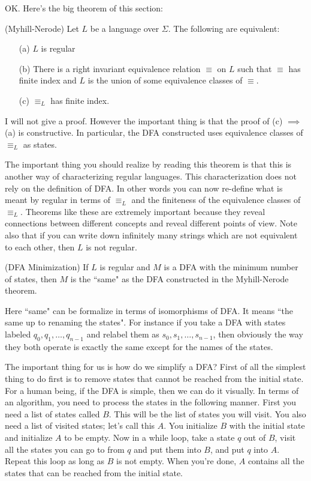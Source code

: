 OK. Here's the big theorem of this section:

\begin{thm} (Myhill-Nerode) \label{T:myhillnerode} Let $L$ be a language over
$\Sigma$.
The following are equivalent:
 \begin{itemize}
  \item[(a)] $L$ is regular
  \item[(b)] There is a right invariant equivalence relation $\equiv$  on $L$
   such that $\equiv$ has finite index and $L$ is the union of some
   equivalence classes of $\equiv$.
  \item[(c)] $\equiv_L$ has finite index.
 \end{itemize}
\end{thm}

I will not give a proof. However the important thing is that the
proof of (c) $\implies$ (a) is constructive. In particular, the DFA
constructed uses equivalence classes of $\equiv_L$ as states.

The important thing you should realize by reading this theorem is
that this is another way of characterizing regular languages. This
characterization does not rely on the definition of DFA. In other
words you can now re-define what is meant by regular in terms of
$\equiv_L$ and the finiteness of the equivalence classes of
$\equiv_L$. Theorems like these are extremely important because they
reveal connections between different concepts and reveal different
points of view. Note also that if you can write down infinitely many
strings which are not equivalent to each other, then $L$ is not
regular.

\begin{thm} (DFA Minimization) \label{T:dfaminimization}
 If $L$ is regular and $M$ is a DFA with the minimum number of
 states, then $M$ is the ``same" as the DFA constructed in the
 Myhill-Nerode theorem.
\end{thm}

Here ``same" can be formalize in terms of isomorphisms of DFA. It
means ``the same up to renaming the states". For instance if you
take a DFA with states labeled $q_0, q_1, \ldots, q_{n-1}$ and
relabel them as $s_0, s_1, \ldots, s_{n-1}$, then obviously the way
they both operate is exactly the same except for the names of the
states.

The important thing for us is how do we simplify a DFA? First of all
the simplest thing to do first is to remove states that cannot be
reached from the initial state. For a human being, if the DFA is
simple, then we can do it visually. In terms of an algorithm, you
need to process the states in the following manner. First you need a
list of states called $B$. This will be the list of states you will
visit. You also need a list of visited states; let's call this $A$.
You initialize $B$ with the initial state and initialize $A$ to be
empty. Now in a while loop, take a state $q$ out of $B$, visit all
the states you can go to from $q$ and put them into $B$, and put $q$
into $A$. Repeat this loop as long as $B$ is not empty. When you're
done, $A$ contains all the states that can be reached from the
initial state.

